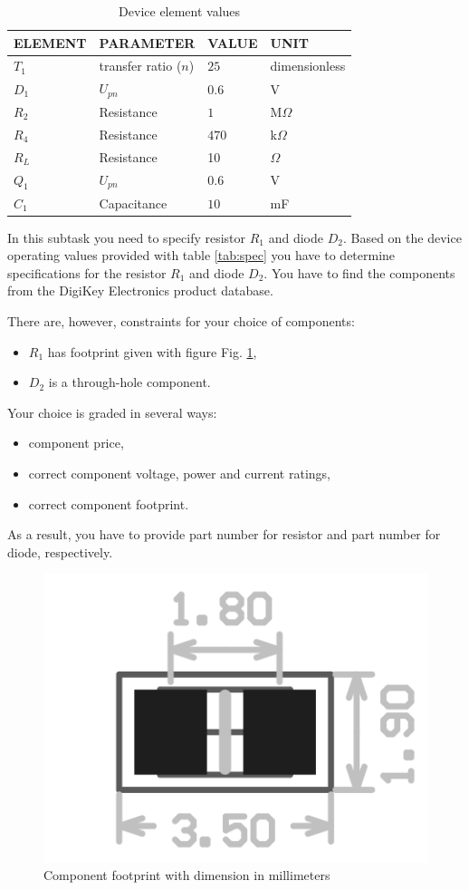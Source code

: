\documentclass{article}
\begin{document}
\begin{table}[h!]
	\caption{Device element values}
	\label{tab:elems}
	\begin{tabularx}{\linewidth}{|X|X|X|X|} \hline
		ELEMENT & PARAMETER & VALUE & UNIT \\ \hline
		$T_1$ & transfer ratio ($n$) & $25$ &  dimensionless \\ \hline
		$D_1$ & $U_{pn}$ & $0.6$ & V \\ \hline 
		$R_2$ & Resistance & $1$ & M$\Omega$ \\ \hline
		$R_4$ & Resistance & $470$ & k$\Omega$ \\ \hline
		$R_L$ & Resistance & 10 & $\Omega$ \\ \hline
		$Q_1$ & $U_{pn}$ & $0.6$ & V \\ \hline
		$C_1$ & Capacitance & $10$ & mF \\ \hline
	\end{tabularx}
\end{table}
In this subtask you need to specify resistor $R_1$ and diode $D_2$. Based on 
the device operating values provided with table \ref{tab:spec} you have to 
determine specifications for the resistor $R_1$ and diode $D_2$. You have to 
find the components from the DigiKey Electronics product database. 

There are, however, constraints for your choice of components:
\begin{itemize}
	\item $R_1$ has footprint given with figure Fig. \ref{fig:footprint},
	\item $D_2$ is a through-hole component.
\end{itemize} 

Your choice is graded in several ways:
\begin{itemize}
	\item component price,
	\item correct component voltage, power and current ratings,
	\item correct component footprint.
\end{itemize}
As a result, you have to provide part number for resistor and part number for
diode, respectively.

\begin{figure}[h!]
	\centering
	\includegraphics[width=0.5\linewidth]{footprint.png}
	\caption{Component footprint with dimension in millimeters}
	\label{fig:footprint}
\end{figure}
\end{document}
